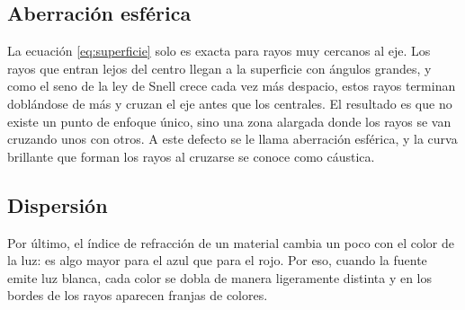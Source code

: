 \subsection{Aberración esférica}
La ecuación \eqref{eq:superficie} solo es exacta para rayos muy cercanos al eje. Los rayos que entran lejos del centro llegan a la superficie con ángulos grandes, y como el seno de la ley de Snell crece cada vez más despacio, estos rayos terminan doblándose de más y cruzan el eje antes que los centrales. El resultado es que no existe un punto de enfoque único, sino una zona alargada donde los rayos se van cruzando unos con otros. A este defecto se le llama aberración esférica, y la curva brillante que forman los rayos al cruzarse se conoce como cáustica.

\subsection{Dispersión}
Por último, el índice de refracción de un material cambia un poco con el color de la luz: es algo mayor para el azul que para el rojo. Por eso, cuando la fuente emite luz blanca, cada color se dobla de manera ligeramente distinta y en los bordes de los rayos aparecen franjas de colores.
